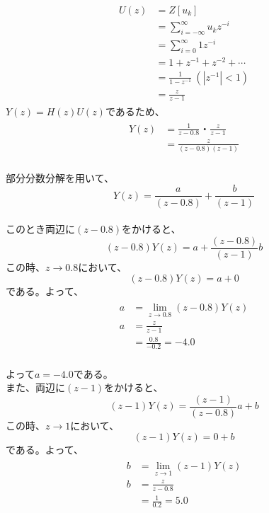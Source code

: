 \documentclass[a4paper,11pt]{ltjsarticle}
\begin{document}
\begin{gather*}
  \begin{split}
    U(z) 
    &= Z[u_{k}]\\
    &= \sum_{i = -\infty}^{\infty}u_{k}z^{-i} \\
    &= \sum_{i = 0}^{\infty}1z^{-i} \\
    &= 1 + z^{-1} + z^{-2} + \dotsb \\
    &= \frac{1}{1 - z^{-1}} \ (|z^{-1}| < 1) \\
    &= \frac{z}{z-1}
  \end{split}
\end{gather*}
$Y(z) = H(z)U(z)$であるため、\\
\begin{gather*}
  \begin{split}
    Y(z) 
    &=\frac{1}{z-0.8} ・ \frac{z}{z-1} \\
    &=\frac{z}{(z-0.8)(z-1)}
  \end{split}
\end{gather*}
\\部分分数分解を用いて、
\begin{equation*}
  Y(z) = \frac{a}{(z-0.8)} + \frac{b}{(z-1)}
\end{equation*}
\\このとき両辺に$(z-0.8)$をかけると、
\begin{equation*}
  (z-0.8)Y(z) = a + \frac{(z-0.8)}{(z-1)}b
\end{equation*}
この時、$z → 0.8$において、
\begin{equation*}
  (z-0.8)Y(z) = a + 0
\end{equation*}
である。よって、
\begin{gather*}
  \begin{split}
    a &= \lim_{z → 0.8}(z-0.8)Y(z) \\
    a &= \frac{z}{z-1} \\
      &= \frac{0.8}{-0.2} = -4.0
  \end{split}
\end{gather*}
\\よって$a = -4.0$である。
\\また、両辺に$(z-1)$をかけると、
\begin{equation*}
  (z-1)Y(z) = \frac{(z-1)}{(z-0.8)}a + b
\end{equation*}
この時、$z → 1$において、
\begin{equation*}
  (z-1)Y(z) = 0 + b
\end{equation*}
である。よって、
\begin{gather*}
  \begin{split}
    b &= \lim_{z → 1}(z-1)Y(z) \\
    b &= \frac{z}{z-0.8} \\
      &= \frac{1}{0.2} = 5.0
  \end{split}
\end{gather*}
\end{document}
